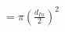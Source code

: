\documentclass[preview]{standalone}
\begin{document}
\begin{align*}
= \pi \left(\frac{d_{In}}{2}\right)^2
\end{align*}
\end{document}
